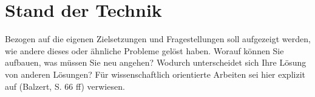 \chapter{Stand der Technik}



Bezogen auf die eigenen Zielsetzungen und Fragestellungen soll aufgezeigt werden, wie andere dieses oder ähnliche Probleme gelöst haben. Worauf können Sie aufbauen, was müssen Sie neu angehen? Wodurch unterscheidet sich Ihre Lösung von anderen Lösungen? Für wissenschaftlich orientierte Arbeiten sei hier explizit auf (Balzert, S. 66 ff) verwiesen.